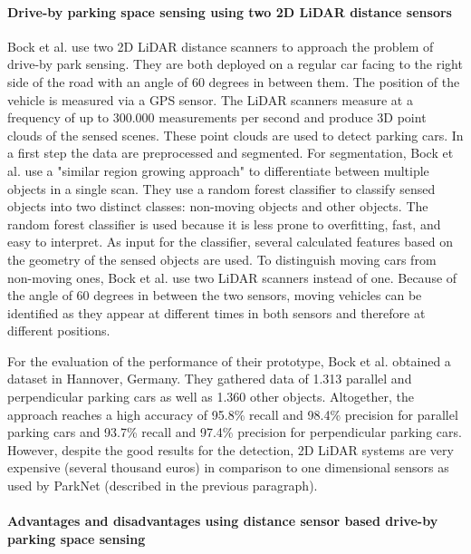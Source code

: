 \paragraph{Drive-by parking space sensing using two 2D LiDAR distance sensors}

Bock et al. \cite{Bock2015} use two 2D LiDAR distance scanners to approach the problem of drive-by park sensing. They are both deployed on a regular car facing to the right side of the road with an angle of 60 degrees in between them. The position of the vehicle is measured via a GPS sensor.
The LiDAR scanners measure at a frequency of up to 300.000 measurements per second and produce 3D point clouds of the sensed scenes. These point clouds are used to detect parking cars. In a first step the data are preprocessed and segmented. For segmentation, Bock et al. use a "similar region growing approach" to differentiate between multiple objects in a single scan. They use a random forest classifier to classify sensed objects into two distinct classes: non-moving objects and other objects. The random forest classifier is used because it is less prone to overfitting, fast, and easy to interpret. As input for the classifier, several calculated features based on the geometry of the sensed objects are used. To distinguish moving cars from non-moving ones, Bock et al. use two LiDAR scanners instead of one. Because of the angle of 60 degrees in between the two sensors, moving vehicles can be identified as they appear at different times in both sensors and therefore at different positions.

For the evaluation of the performance of their prototype, Bock et al. obtained a dataset in Hannover, Germany. They gathered data of 1.313 parallel and perpendicular parking cars as well as 1.360 other objects. Altogether, the approach reaches a high accuracy of 95.8\% recall and 98.4\% precision for parallel parking cars and 93.7\% recall and 97.4\% precision for perpendicular parking cars. However, despite the good results for the detection, 2D LiDAR systems are very expensive (several thousand euros) in comparison to one dimensional sensors as used by ParkNet (described in the previous paragraph).


\paragraph{Advantages and disadvantages using distance sensor based drive-by parking space sensing}

